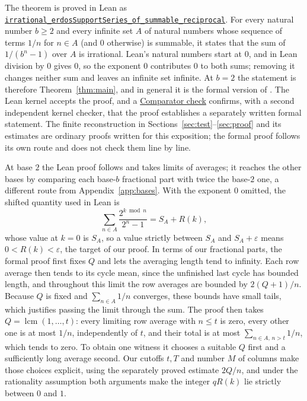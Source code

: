\documentclass[10pt]{article}
\theoremstyle{plain}
\theoremstyle{definition}
\theoremstyle{remark}
\begin{document}
The theorem is proved in Lean as
\href{https://github.com/wcook04/plectis-erdos/blob/436f55ebdafa67e4af0fff79f621c13f2ded12bf/lean/Erdos249257/AllBaseReciprocalSupportIrrationality.lean#L395}{\texttt{irrational\_erdosSupportSeries\_of\_summable\_reciprocal}}.
For every natural number $b\ge2$ and every infinite set $A$ of natural
numbers whose sequence of terms $1/n$ for $n\in A$ (and $0$ otherwise)
is summable, it states that the sum of $1/(b^n-1)$ over $A$ is
irrational. Lean's natural numbers start at $0$, and in Lean division by
$0$ gives $0$, so the exponent $0$ contributes $0$ to both sums; removing
it changes neither sum and leaves an infinite set infinite. At $b=2$ the
statement is therefore Theorem~\ref{thm:main}, and in general it is the
formal version of \cite[Theorem~A.1]{shortpaper}. The Lean kernel
accepts the proof, and a
\href{https://github.com/wcook04/plectis-erdos/blob/846d57d3f9926696332d782eb232aaf3cf803a99/evidence/erdos-257-mersenne-support-subseries.md#res-reciprocal-support-comparator}{Comparator check}
confirms, with a second independent kernel checker, that the proof
establishes a separately written formal statement. The finite
reconstruction in Sections~\ref{sec:test}--\ref{sec:proof} and its
estimates are ordinary proofs written for this exposition; the formal
proof follows its own route and does not check them line by line.

At base $2$ the Lean proof follows \cite[Appendix~A]{shortpaper} and
takes limits of averages; it reaches the other bases by comparing each
base-$b$ fractional part with twice the base-$2$ one, a different route
from Appendix~\ref{app:bases}. With the exponent $0$ omitted, the
shifted quantity used in Lean is
\[
 \sum_{n\in A}\frac{2^{k\bmod n}}{2^n-1}=S_A+R(k),
\]
whose value at $k=0$ is $S_A$, so a value strictly between $S_A$ and
$S_A+\varepsilon$ means $0<R(k)<\varepsilon$, the target of our proof.
In terms of our fractional parts, the formal proof first fixes $Q$ and
lets the averaging length tend to infinity. Each row average then tends
to its cycle mean, since the unfinished last cycle has bounded length,
and throughout this limit the row averages are bounded by $2(Q+1)/n$.
Because $Q$ is fixed and $\sum_{n\in A}1/n$ converges, these bounds
have small tails, which justifies passing the limit through the sum.
The proof then takes $Q=\operatorname{lcm}(1,\dots,t)$: every limiting
row average with $n\le t$ is zero, every other one is at most $1/n$,
independently of $t$, and their total is at most
$\sum_{n\in A,\,n>t}1/n$, which tends to zero. To obtain one witness it
chooses a suitable $Q$ first and a sufficiently long average second. Our
cutoffs $t,T$ and number $M$ of columns make those choices explicit,
using the separately proved estimate $2Q/n$, and under the rationality
assumption both arguments make the integer $qR(k)$ lie strictly between
$0$ and $1$.
\end{document}
